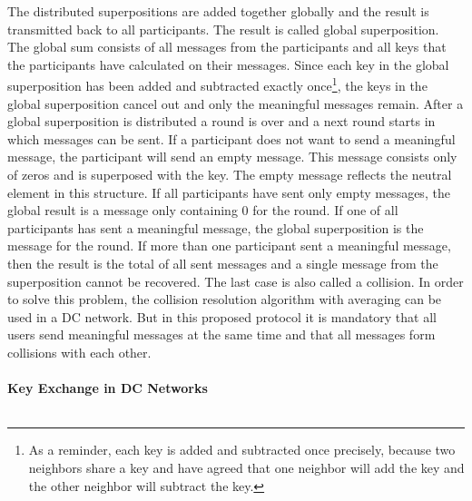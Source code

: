 The distributed superpositions are added together globally and the result is transmitted back to all participants. The result is called global superposition. The global sum consists of all messages from the participants and all keys that the participants have calculated on their messages. Since each key in the global superposition has been added and subtracted exactly once\footnote[4]{As a reminder, each key is added and subtracted once precisely, because two neighbors share a key and have agreed that one neighbor will add the key and the other neighbor will subtract the key.}, the keys in the global superposition cancel out and only the meaningful messages remain. After a global superposition is distributed a round is over and a next round starts in which messages can be sent. If a participant does not want to send a meaningful message, the participant will send an empty message. This message consists only of zeros and is superposed with the key. The empty message reflects the neutral element in this structure. If all participants have sent only empty messages, the global result is a message only containing 0 for the round. If one of all participants has sent a meaningful message, the global superposition is the message for the round. If more than one participant sent a meaningful message, then the result is the total of all sent messages and a single message from the superposition cannot be recovered. The last case is also called a collision. In order to solve this problem, the collision resolution algorithm with averaging can be used in a DC network. But in this proposed protocol it is mandatory that all users send meaningful messages at the same time and that all messages form collisions with each other. %
\\
\\
\textbf{Key Exchange in DC Networks}
\label{subsec:key_ex}
\\
\\
